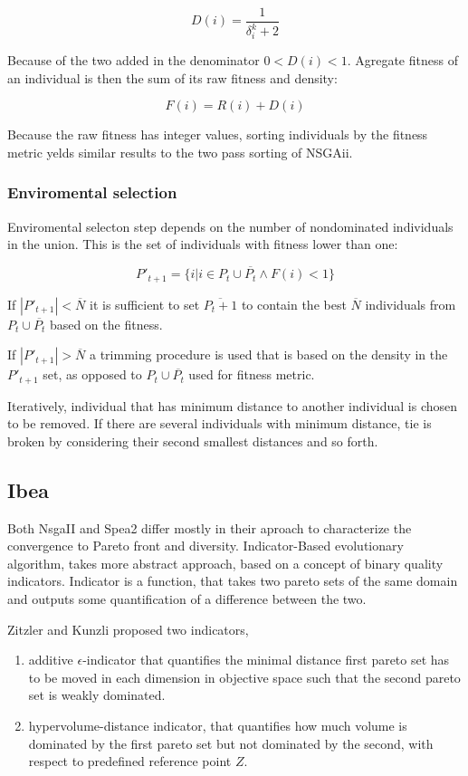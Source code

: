 \documentclass[12pt,oneside,draft]{fithesis2}
\begin{document}
$$D(i) = \frac{1}{\delta^k_i + 2} $$

Because of the two added in the denominator  $0 < D(i) < 1$. Agregate fitness of an individual is then the sum of its raw fitness and density:

$$F(i) = R(i) + D(i) $$

Because the raw fitness has integer values, sorting individuals by the fitness metric yelds similar results to the two pass sorting of NSGAii.

\subsubsection{Enviromental selection}
Enviromental selecton step depends on the number of nondominated individuals in the union. This is the set of individuals with fitness lower than one:

$$P'_{t+1} =\{i | i \in P_t \cup \overline{P_t} \land F(i)<1\}$$

If $|P'_{t+1}| < \overline N$ it is sufficient to set $\overline{P_t+1}$ to contain the best $\overline N$ individuals from $P_t \cup \overline{P_t}$ based on the fitness.

If $|P'_{t+1}| > \overline N$ a trimming procedure is used that is based on the density in the $P'_{t+1}$ set, as opposed to $P_t \cup \overline{P_t}$ used for fitness metric.

Iteratively, individual that has minimum distance to another individual is chosen to be removed. If there are several individuals with minimum distance, tie is broken by considering their second smallest distances and so forth. 

\subsection{Ibea}
Both NsgaII and Spea2 differ mostly in their aproach to characterize the convergence to Pareto front and diversity. 
Indicator-Based evolutionary algorithm, takes more abstract approach, based on a concept of binary quality indicators.
Indicator is a function, that takes two pareto sets of the same domain and outputs some quantification of a difference between the two.

Zitzler and Kunzli proposed two indicators,
\begin{enumerate}
\item additive $\epsilon$-indicator that quantifies the minimal distance first pareto set has to be moved in each dimension in objective space such that the second pareto set is weakly dominated.

\item hypervolume-distance indicator, that quantifies how much volume is dominated by the first pareto set but not dominated by the second, with respect to predefined reference point $Z$.
\end{enumerate}
\end{document}
